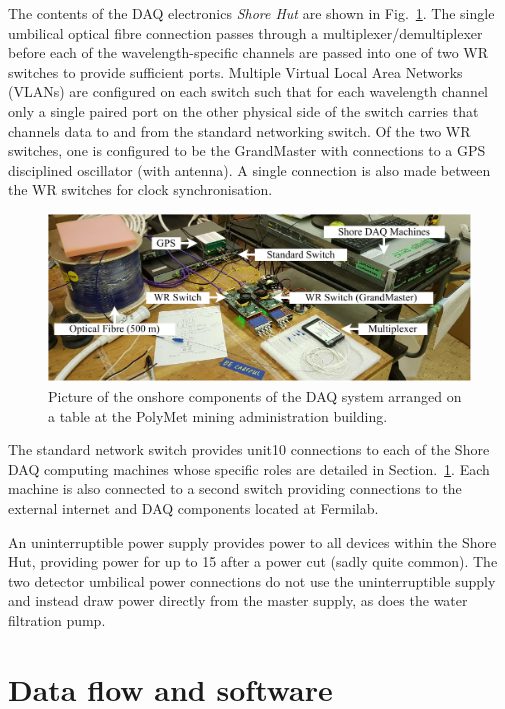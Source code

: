 The contents of the DAQ electronics \emph{Shore Hut} are shown in Fig.~\ref{fig:hut_daq}. The
single umbilical optical fibre connection passes through a multiplexer/demultiplexer before each
of the wavelength-specific channels are passed into one of two WR switches to provide sufficient
ports. Multiple Virtual Local Area Networks (VLANs) are configured on each switch such that for
each wavelength channel only a single paired port on the other physical side of the switch carries
that channels data to and from the standard networking switch. Of the two WR switches, one is
configured to be the GrandMaster with connections to a GPS disciplined oscillator (with antenna).
A single connection is also made between the WR switches for clock synchronisation.

\begin{figure} %
    \includegraphics[width=\textwidth]{diagrams/5-daq/hut_daq.pdf}
    \caption[Picture of the onshore components of the \chipsfive DAQ system]
    {Picture of the onshore components of the \chipsfive DAQ system arranged on a table at the
        PolyMet mining administration building.}
    \label{fig:hut_daq}
\end{figure}

The standard network switch provides unit{10}{} connections to each of the Shore DAQ
computing machines whose specific roles are detailed in Section.~\ref{sec:daq_soft}. Each machine
is also connected to a second switch providing connections to the external internet and DAQ
components located at Fermilab.

An uninterruptible power supply provides power to all devices within the Shore Hut, providing
power for up to \unit{15}{} after a power cut (sadly quite common). The two detector
umbilical power connections do not use the uninterruptible supply and instead draw power directly
from the master supply, as does the water filtration pump.

\section{Data flow and software} %
\label{sec:daq_soft} %

